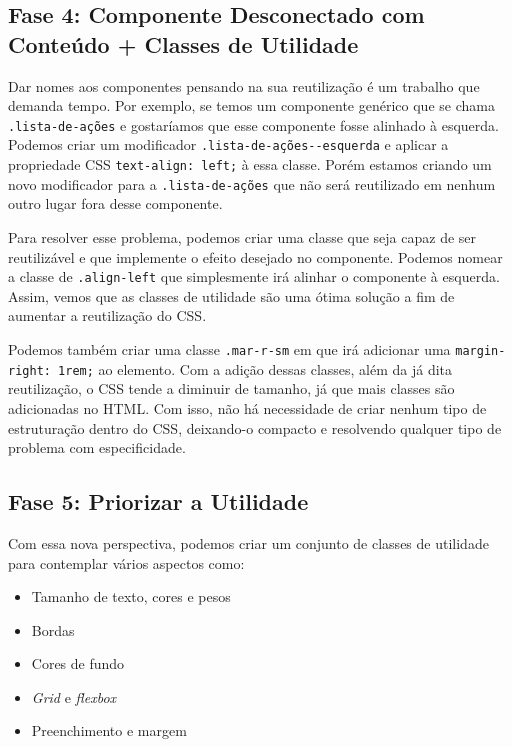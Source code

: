 \hypertarget{fase-4-componente-desconectado-com-conteuxfado-classes-de-utilidade}{%
\subsection{Fase 4: Componente Desconectado com Conteúdo + Classes de
Utilidade}\label{fase-4-componente-desconectado-com-conteuxfado-classes-de-utilidade}}

Dar nomes aos componentes pensando na sua reutilização é um trabalho que
demanda tempo. Por exemplo, se temos um componente genérico que se chama
\texttt{.lista-de-ações} e gostaríamos que esse componente fosse
alinhado à esquerda. Podemos criar um modificador
\texttt{.lista-de-ações-\/-esquerda} e aplicar a propriedade CSS
\texttt{text-align:\ left;} à essa classe. Porém estamos criando um novo
modificador para a \texttt{.lista-de-ações} que não será reutilizado em
nenhum outro lugar fora desse componente.

Para resolver esse problema, podemos criar uma classe que seja capaz de
ser reutilizável e que implemente o efeito desejado no componente.
Podemos nomear a classe de \texttt{.align-left} que simplesmente irá
alinhar o componente à esquerda. Assim, vemos que as classes de
utilidade são uma ótima solução a fim de aumentar a reutilização do CSS.

Podemos também criar uma classe \texttt{.mar-r-sm} em que irá adicionar
uma \texttt{margin-right:\ 1rem;} ao elemento. Com a adição dessas
classes, além da já dita reutilização, o CSS tende a diminuir de
tamanho, já que mais classes são adicionadas no HTML. Com isso, não há
necessidade de criar nenhum tipo de estruturação dentro do CSS,
deixando-o compacto e resolvendo qualquer tipo de problema com
especificidade.

\hypertarget{fase-5-priorizar-a-utilidade}{%
\subsection{Fase 5: Priorizar a
Utilidade}\label{fase-5-priorizar-a-utilidade}}

Com essa nova perspectiva, podemos criar um conjunto de classes de
utilidade para contemplar vários aspectos como:

\begin{itemize}
\tightlist
\item
  Tamanho de texto, cores e pesos
\item
  Bordas
\item
  Cores de fundo
\item
  \emph{Grid} e \emph{flexbox}
\item
  Preenchimento e margem
\end{itemize}

